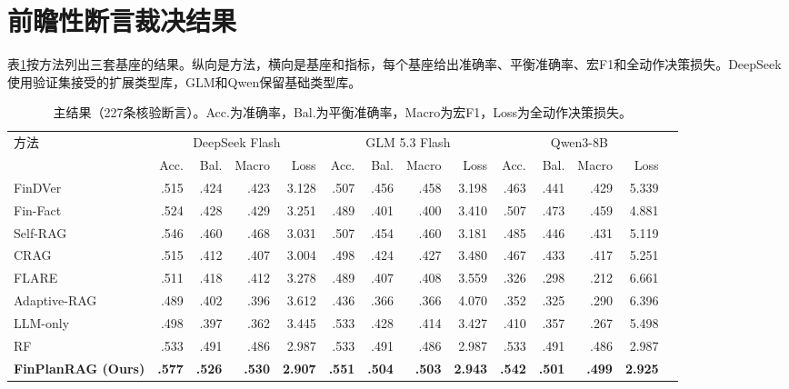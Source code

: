 \section{前瞻性断言裁决结果}

表\ref{tab:main}按方法列出三套基座的结果。纵向是方法，横向是基座和指标，每个基座给出准确率、平衡准确率、宏F1和全动作决策损失。DeepSeek使用验证集接受的扩展类型库，GLM和Qwen保留基础类型库。

\begin{table}[htbp]
\centering
{}
\setlength{\tabcolsep}{2.2pt}
\caption{主结果（227条核验断言）。Acc.为准确率，Bal.为平衡准确率，Macro为宏F1，Loss为全动作决策损失。}
\label{tab:main}
\begin{tabular}{lrrrrrrrrrrrrr}
\toprule
\multirow{2}{*}{方法} & \multicolumn{4}{c}{DeepSeek Flash} & \multicolumn{4}{c}{GLM 5.3 Flash} & \multicolumn{4}{c}{Qwen3-8B} \\
\cmidrule(lr){2-5}\cmidrule(lr){6-9}\cmidrule(lr){10-13}
 & Acc. & Bal. & Macro & Loss & Acc. & Bal. & Macro & Loss & Acc. & Bal. & Macro & Loss \\
\midrule
FinDVer & .515 & .424 & .423 & 3.128 & .507 & .456 & .458 & 3.198 & .463 & .441 & .429 & 5.339 \\
Fin-Fact & .524 & .428 & .429 & 3.251 & .489 & .401 & .400 & 3.410 & .507 & .473 & .459 & 4.881 \\
Self-RAG & .546 & .460 & .468 & 3.031 & .507 & .454 & .460 & 3.181 & .485 & .446 & .431 & 5.119 \\
CRAG & .515 & .412 & .407 & 3.004 & .498 & .424 & .427 & 3.480 & .467 & .433 & .417 & 5.251 \\
FLARE & .511 & .418 & .412 & 3.278 & .489 & .407 & .408 & 3.559 & .326 & .298 & .212 & 6.661 \\
Adaptive-RAG & .489 & .402 & .396 & 3.612 & .436 & .366 & .366 & 4.070 & .352 & .325 & .290 & 6.396 \\
\midrule
LLM-only & .498 & .397 & .362 & 3.445 & .533 & .428 & .414 & 3.427 & .410 & .357 & .267 & 5.498 \\
RF & .533 & .491 & .486 & 2.987 & .533 & .491 & .486 & 2.987 & .533 & .491 & .486 & 2.987 \\
\textbf{FinPlanRAG (Ours)} & \textbf{.577} & \textbf{.526} & \textbf{.530} & \textbf{2.907} & \textbf{.551} & \textbf{.504} & \textbf{.503} & \textbf{2.943} & \textbf{.542} & \textbf{.501} & \textbf{.499} & \textbf{2.925} \\
\bottomrule
\end{tabular}
\end{table}

